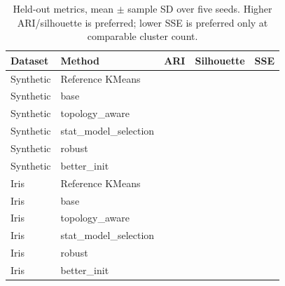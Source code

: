 \documentclass[conference]{IEEEtran}
\begin{document}
\begin{table}[t]\caption{Held-out metrics, mean $\pm$ sample SD over five seeds. Higher ARI/silhouette is preferred; lower SSE is preferred only at comparable cluster count.}\label{tab:results}\centering\scriptsize
\begin{tabular}{llrrr}\toprule Dataset & Method & ARI & Silhouette & SSE\\\midrule
Synthetic & Reference KMeans &  &  & \\
Synthetic & base &  &  & \\
Synthetic & topology\_aware &  &  & \\
Synthetic & stat\_model\_selection &  &  & \\
Synthetic & robust &  &  & \\
Synthetic & better\_init &  &  & \\
Iris & Reference KMeans &  &  & \\
Iris & base &  &  & \\
Iris & topology\_aware &  &  & \\
Iris & stat\_model\_selection &  &  & \\
Iris & robust &  &  & \\
Iris & better\_init &  &  & \\\bottomrule\end{tabular}\end{table}
\end{document}
